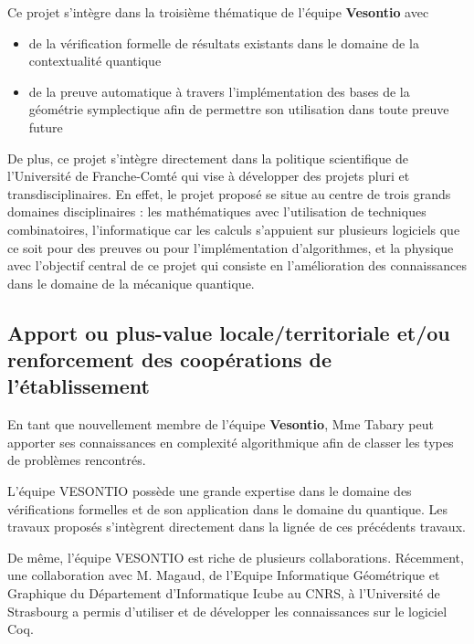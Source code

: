 \documentclass[10pt, a4paper, french]{article}
\begin{document}
Ce projet s'intègre dans la troisième thématique de l'équipe \textbf{Vesontio} avec 
\begin{itemize}
    \item de la vérification formelle de résultats existants dans le domaine de la contextualité quantique
 \item  de la preuve automatique à travers l'implémentation des bases de la géométrie symplectique afin de permettre son utilisation dans toute preuve future
\end{itemize}

De plus, ce projet s'intègre directement dans la politique scientifique de l'Université de Franche-Comté qui vise à développer des projets pluri et transdisciplinaires. En effet, le projet proposé  se  situe au centre de trois grands domaines disciplinaires : les mathématiques avec l'utilisation de techniques combinatoires, l'informatique car les calculs s'appuient sur plusieurs logiciels que ce soit pour des preuves ou pour l'implémentation d'algorithmes, et la physique avec l'objectif central de ce projet qui consiste en l'amélioration des connaissances dans le domaine de la mécanique quantique.

\subsection{Apport ou plus-value locale/territoriale et/ou renforcement des coopérations de l'établissement}

En tant que nouvellement membre de l'équipe \textbf{Vesontio}, Mme Tabary peut apporter ses connaissances en complexité algorithmique afin de classer les types de problèmes rencontrés\cite{tabary2018new, TomDavot, tabary2020new}. 

L'équipe VESONTIO possède une grande expertise dans le domaine des vérifications formelles et de son application dans le domaine du quantique. Les travaux proposés s'intègrent directement dans la lignée de ces précédents travaux. 

De même, l'équipe VESONTIO est riche de plusieurs collaborations. Récemment, une collaboration avec M. Magaud, de l'Equipe Informatique Géométrique et Graphique du Département d'Informatique
Icube au CNRS, à l'Université de Strasbourg a permis d'utiliser et de développer les connaissances sur le logiciel Coq.



\end{document}
